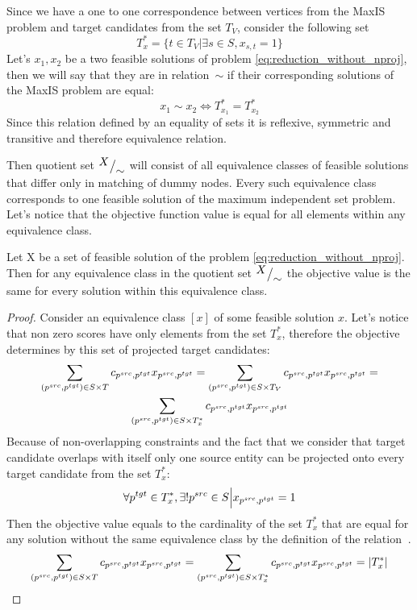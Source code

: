 Since we have a one to one correspondence between vertices from the MaxIS problem and target
candidates from the set \( T_V \), consider the following set
\[
    T^*_{x} = \{ t \in T_V | \exists s \in S, x_{s, t} = 1 \}
\]
Let's \( x_1, x_2 \) be a two feasible solutions of problem \eqref{eq:reduction_without_nproj}, then we will say that
they are in relation~\( \sim \) if their corresponding solutions of the MaxIS problem are equal:
\[
    x_1 \sim x_2 \Leftrightarrow T^{*}_{x_1} = T^{*}_{x_2}
\]
Since this relation defined by an equality of sets it is reflexive, symmetric and transitive and therefore
equivalence relation.

Then quotient set \( {^{\textstyle X}\big/_{\textstyle \sim}} \) will consist of all equivalence classes of feasible solutions
that differ only in matching of dummy nodes. Every such equivalence class corresponds to one feasible solution of
the maximum independent set problem. Let's notice that the objective function value is equal for all
elements within any equivalence class.
\begin{lemma}
    Let X be a set of feasible solution of the problem \eqref{eq:reduction_without_nproj}. Then
    for any equivalence class in the quotient set \( {^{\textstyle X}\big/_{\textstyle \sim}} \) the objective
    value is the same for every solution within this equivalence class.
\end{lemma}
\begin{proof}
    Consider an equivalence class \( [x] \) of some feasible solution \( x \).
    Let's notice that non zero scores have only elements from the set \( T^*_x \),
    therefore the objective determines by this set of projected target candidates:
    \begin{multline*}
        \sum\limits_{(p^{src}, p^{tgt}) \in S \times T} c_{p^{src}, p^{tgt}} x_{p^{src}, p^{tgt}} =
        \sum\limits_{(p^{src}, p^{tgt}) \in S \times T_V} c_{p^{src}, p^{tgt}} x_{p^{src}, p^{tgt}} = \\
        \sum\limits_{(p^{src}, p^{tgt}) \in S \times T^{*}_{x}} c_{p^{src}, p^{tgt}} x_{p^{src}, p^{tgt}}
    \end{multline*}
    Because of non-overlapping constraints and the fact that we consider that target candidate overlaps with
    itself only one source entity can be projected onto every target candidate from the set \( T_x^* \):
    \[
        \forall p^{tgt} \in T^*_x, \exists! p^{src} \in S \Big| x_{p^{src}, p^{tgt}} = 1
    \]
    Then the objective value equals to the cardinality of the set \( T^*_x \) that are equal for
    any solution without the same equivalence class by the definition of the relation \( ~ \).
    \[
        \sum\limits_{(p^{src}, p^{tgt}) \in S \times T} c_{p^{src}, p^{tgt}} x_{p^{src}, p^{tgt}} =
        \sum\limits_{(p^{src}, p^{tgt}) \in S \times T^{*}_{x}} c_{p^{src}, p^{tgt}} x_{p^{src}, p^{tgt}} =
        |T_x^*|
    \]
\end{proof}
